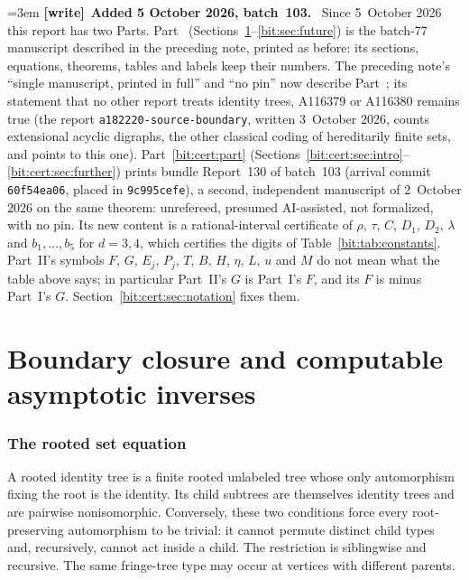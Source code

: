 \documentclass[11pt]{article}
\theoremstyle{definition}\newtheorem{definition}[theorem]{Definition}
\theoremstyle{remark}\newtheorem{remark}[theorem]{Remark}
\newenvironment{writenote}[1][]{\par\smallskip\begingroup\small\emergencystretch=3em
 \noindent\textbf{[write]}\if\relax\detokenize{#1}\relax\else~\textbf{#1.}\fi\ }%
 {\par\endgroup\smallskip}
\begin{document}
\begin{writenote}[Added 5 October 2026, batch~103]
Since 5~October 2026 this report has two Parts. Part~\ref{bit:part:one}
(Sections~\ref{bit:sec:equation}--\ref{bit:sec:future}) is the batch-77
manuscript described in the preceding note, printed as before: its sections,
equations, theorems, tables and labels keep their numbers. The preceding
note's ``single manuscript, printed in full'' and ``no pin'' now describe
Part~\ref{bit:part:one}; its statement that no other report treats identity
trees, A116379 or A116380 remains true (the report
\texttt{a182220-\allowbreak source-\allowbreak boundary}, written
3~October 2026, counts extensional acyclic digraphs, the other classical
coding of hereditarily finite sets, and points to this one).
Part~\ref{bit:cert:part}
(Sections~\ref{bit:cert:sec:intro}--\ref{bit:cert:sec:further}) prints
bundle Report~130 of batch~103 (arrival commit \texttt{60f54ea06}, placed in
\texttt{9c995cefe}), a second, independent manuscript of 2~October 2026 on
the same theorem: unrefereed, presumed AI-assisted, not formalized, with no
pin. Its new content is a rational-interval certificate of $\rho$, $\tau$,
$C$, $D_1$, $D_2$, $\lambda$ and $b_1,\ldots,b_5$ for $d=3,4$, which certifies
the digits of Table~\ref{bit:tab:constants}. Part~II's symbols $F$, $G$,
$E_j$, $P_j$, $T$, $B$, $H$, $\eta$, $L$, $u$ and $M$ do not mean what the table
above says; in particular Part~II's $G$ is Part~I's $F$, and its $F$ is
minus Part~I's $G$. Section~\ref{bit:cert:sec:notation} fixes them.
\end{writenote}
\clearpage

\part{Boundary closure and computable asymptotic inverses}\label{bit:part:one}

\section{The rooted set equation}
\label{bit:sec:equation}
A rooted identity tree is a finite rooted unlabeled tree whose only automorphism fixing the root is the identity. Its child subtrees are themselves identity trees and are pairwise nonisomorphic. Conversely, these two conditions force every root-preserving automorphism to be trivial: it cannot permute distinct child types and, recursively, cannot act inside a child. The restriction is siblingwise and recursive. The same fringe-tree type may occur at vertices with different parents.
\end{document}
